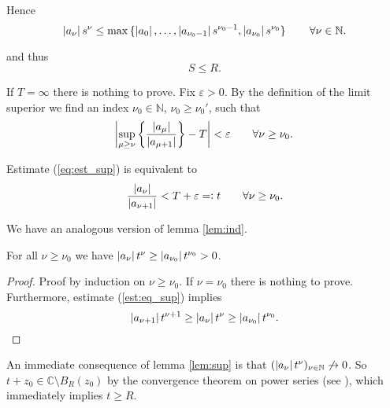 \begin{enumerate}[label = \textbf{Exercise \arabic*.},wide = 0pt, itemsep=1.5ex]
		Hence 
		\begin{equation}
			\abs[0]{a_\nu}s^\nu \leq \max\cbr[0]{\abs[0]{a_0},\dots,\abs[0]{a_{\nu_0 - 1}}s^{\nu_0 -1},\abs[0]{a_{\nu_0}}s^{\nu_0}} \qquad \forall \nu \in \mathbb{N}.
			\label{eq:bound}
		\end{equation}

		\noindent and thus
		\begin{equation}
			S \leq R.
		\end{equation}

	If $T = \infty$ there is nothing to prove. Fix $ \varepsilon > 0$. By the definition of the limit superior we find an index $\nu_0 \in \mathbb{N}$, $\nu_0 \geq \nu_0'$, such that
		\begin{equation}
			\abs[3]{\sup_{\mu \geq \nu}\cbr[3]{\frac{\abs[0]{a_\mu}}{\abs[0]{a_{\mu + 1}}}} - T} < \varepsilon \qquad \forall \nu \geq \nu_0.
			\label{eq:est_sup}
		\end{equation}

		Estimate (\ref{eq:est_sup}) is equivalent to
		\begin{equation}
			\frac{\abs[0]{a_\nu}}{\abs[0]{a_{\nu + 1}}} < T + \varepsilon =: t \qquad \forall \nu \geq \nu_0.
			\label{est:eq_sup}
		\end{equation}

		We have an analogous version of lemma \ref{lem:ind}.
		\begin{lemma}
			For all $\nu \geq \nu_0$ we have $\abs[0]{a_\nu}t^\nu \geq \abs[0]{a_{\nu_0}}t^{\nu_0} > 0$.
			\label{lem:sup}
		\end{lemma}

		\begin{proof}
			Proof by induction on $\nu \geq \nu_0$. If $\nu = \nu_0$ there is nothing to prove. Furthermore, estimate (\ref{est:eq_sup}) implies
			\begin{equation}
				\abs[0]{a_{\nu + 1}}t^{\nu + 1} \geq \abs[0]{a_{\nu}}t^{\nu} \geq \abs[0]{a_{\nu_0}}t^{\nu_0}.
			\end{equation}
		\end{proof} 

		An immediate consequence of lemma \ref{lem:sup} is that $(\abs[0]{a_\nu}t^\nu)_{\nu \in \mathbb{N}} \not\to 0$. So $t + z_0 \in \mathbb{C} \setminus B_R(z_0)$ by the convergence theorem on power series (see \cite[99]{remmert2002funktionentheorie}), which immediately implies $t \geq R$. 
\end{enumerate}
\printbibliography

